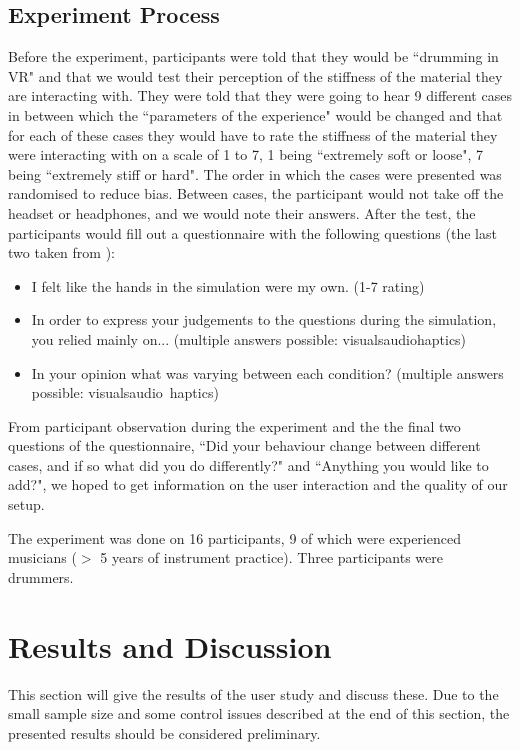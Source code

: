 \documentclass{article}
\begin{document}
\subsection{Experiment Process}
Before the experiment, participants were told that they would be ``drumming in VR" and that we would test their perception of the stiffness of the material they are interacting with. They were told that they were going to hear 9 different cases in between which the ``parameters of the experience" would be changed and that for each of these cases they would have to rate the stiffness of the material they were interacting with on a scale of 1 to 7, 1 being ``extremely soft or loose", 7 being ``extremely stiff or hard". The order in which the cases were presented was randomised to reduce bias. Between cases, the participant would not take off the headset or headphones, and we would note their answers. After the test, the participants would fill out a questionnaire with the following questions (the last two taken from \cite{avanzini2006}):

\begin{itemize}
    \item I felt like the hands in the simulation were my own. (1-7 rating)
    \item In order to express your judgements to the questions during the simulation, you relied mainly on... (multiple answers possible: visuals\textbar audio\textbar haptics)
    \item In your opinion what was varying between each condition? (multiple answers possible: visuals\textbar audio\textbar\ haptics)
\end{itemize}
From participant observation during the experiment and the the final two questions of the questionnaire, ``Did your behaviour change between different cases, and if so what did you do differently?" and ``Anything you would like to add?", we hoped to get information on the user interaction and the quality of our setup.

The experiment was done on 16 participants, 9 of which were experienced musicians ($>$ 5 years of instrument practice). Three participants were drummers. 

\section{Results and Discussion}\label{sec:resDisc}
This section will give the results of the user study and discuss these. Due to the small sample size and some control issues described at the end of this section, the presented results should be considered preliminary.
\end{document}
